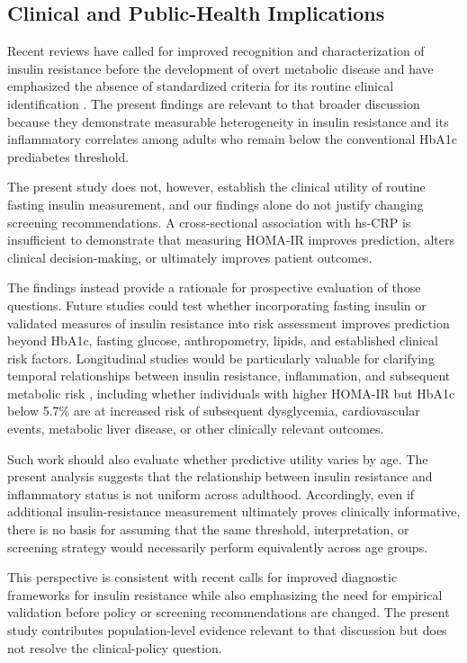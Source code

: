 \documentclass[11pt]{article}
\begin{document}
\subsection{Clinical and Public-Health Implications}

Recent reviews have called for improved recognition and characterization
of insulin resistance before the development of overt metabolic disease
and have emphasized the absence of standardized criteria for its routine
clinical identification \citep{Rodzen2026}. The present findings are relevant to that broader
discussion because they demonstrate measurable heterogeneity in insulin
resistance and its inflammatory correlates among adults who remain below
the conventional HbA1c prediabetes threshold.

The present study does not, however, establish the clinical utility of
routine fasting insulin measurement, and our findings alone do not justify
changing screening recommendations. A cross-sectional association with
hs-CRP is insufficient to demonstrate that measuring HOMA-IR improves
prediction, alters clinical decision-making, or ultimately improves patient
outcomes.

The findings instead provide a rationale for prospective evaluation of
those questions. Future studies could test whether incorporating fasting
insulin or validated measures of insulin resistance into risk assessment
improves prediction beyond HbA1c, fasting glucose, anthropometry, lipids,
and established clinical risk factors. Longitudinal studies would be
particularly valuable for clarifying temporal relationships between insulin
resistance, inflammation, and subsequent metabolic risk
\citep{Park2009,Yan2019}, including whether individuals with higher HOMA-IR
but HbA1c below 5.7\% are at increased risk of subsequent dysglycemia,
cardiovascular events, metabolic liver disease, or other clinically
relevant outcomes.

Such work should also evaluate whether predictive utility varies by age.
The present analysis suggests that the relationship between insulin
resistance and inflammatory status is not uniform across adulthood.
Accordingly, even if additional insulin-resistance measurement ultimately
proves clinically informative, there is no basis for assuming that the
same threshold, interpretation, or screening strategy would necessarily
perform equivalently across age groups.

This perspective is consistent with recent calls for improved diagnostic
frameworks for insulin resistance while also emphasizing the need for
empirical validation before policy or screening recommendations are
changed. The present study contributes population-level evidence relevant
to that discussion but does not resolve the clinical-policy question.
\end{document}
